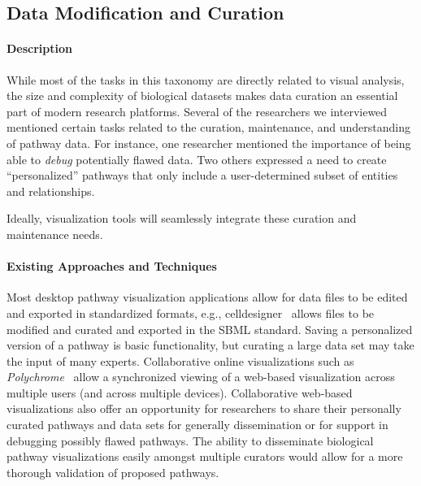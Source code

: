 \documentclass[twocolumn]{bmcart}%
\begin{document}
\subsection*{Data Modification and Curation}

\paragraph*{Description}

While most of the tasks in this taxonomy are directly related to visual analysis, the size and complexity of biological datasets makes data curation an essential part of modern research platforms.
Several of the researchers we interviewed mentioned certain tasks related to the curation, maintenance, and understanding of pathway data.
For instance, one researcher mentioned the importance of being able to \emph{debug} potentially flawed data.
Two others expressed a need to create ``personalized'' pathways that only include a user-determined subset of entities and relationships.

Ideally, visualization tools will seamlessly integrate these curation and maintenance needs.

\paragraph*{Existing Approaches and Techniques}
Most desktop pathway visualization applications allow for data files to be edited and exported in standardized formats, e.g., celldesigner~\cite{funahashi2008celldesigner} allows files to be modified and curated and exported in the SBML standard.
Saving a  personalized version of a pathway is basic functionality, but curating a large data set may take the input of many experts.
Collaborative online visualizations such as \textit{Polychrome}~\cite{badam2014polychrome} allow a synchronized viewing of a web-based visualization across multiple users (and across multiple devices).
Collaborative web-based visualizations also offer an opportunity for researchers to share their personally curated pathways and data sets for generally dissemination or for support in debugging possibly flawed pathways.
The ability to disseminate biological pathway visualizations easily amongst multiple curators would allow for a more thorough validation of proposed pathways.

\end{document}
